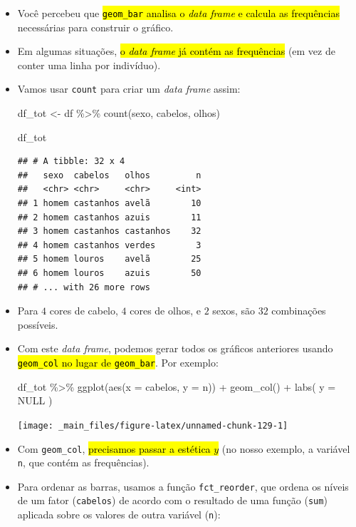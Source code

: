 \documentclass[
  11pt]{report}
\newenvironment{Shaded}{\begin{snugshade}}{\end{snugshade}}
\newcommand{\AttributeTok}[1]{\textcolor[rgb]{0.77,0.63,0.00}{#1}}
\newcommand{\ConstantTok}[1]{\textcolor[rgb]{0.00,0.00,0.00}{#1}}
\newcommand{\FunctionTok}[1]{\textcolor[rgb]{0.00,0.00,0.00}{#1}}
\newcommand{\NormalTok}[1]{#1}
\newcommand{\OtherTok}[1]{\textcolor[rgb]{0.56,0.35,0.01}{#1}}
\newcommand{\SpecialCharTok}[1]{\textcolor[rgb]{0.00,0.00,0.00}{#1}}
\renewenvironment{Shaded}{
    \begin{mdframed}[%
      roundcorner=2pt,%
      innerleftmargin=5pt,%
      innerrightmargin=5pt,%
      topline=true,%
      leftline=true,%
      rightline=true,%
      bottomline=true,%
      linewidth=0.5pt,%
      linecolor=black!20,%
      backgroundcolor=black!2,%
      skipabove=2ex,%
      skipbelow=2.5ex%
    ]%
  }
  {
    \end{mdframed}
  }
\begin{document}
\begin{itemize}
\item
  Você percebeu que {\hl{{\mbox{\texttt{geom\_bar}}} analisa o \emph{data frame} e calcula as frequências}} necessárias para construir o gráfico.
\item
  Em algumas situações, {\hl{o \emph{data frame} já contém as frequências}} (em vez de conter uma linha por indivíduo).
\item
  Vamos usar \texttt{count} para criar um \emph{data frame} assim:

\begin{Shaded}
\begin{Highlighting}[]
\NormalTok{df\_tot }\OtherTok{\textless{}{-}}\NormalTok{ df }\SpecialCharTok{\%\textgreater{}\%} 
  \FunctionTok{count}\NormalTok{(sexo, cabelos, olhos)}

\NormalTok{df\_tot}
\end{Highlighting}
\end{Shaded}

\begin{verbatim}
## # A tibble: 32 x 4
##   sexo  cabelos   olhos         n
##   <chr> <chr>     <chr>     <int>
## 1 homem castanhos avelã        10
## 2 homem castanhos azuis        11
## 3 homem castanhos castanhos    32
## 4 homem castanhos verdes        3
## 5 homem louros    avelã        25
## 6 homem louros    azuis        50
## # ... with 26 more rows
\end{verbatim}
\item
  Para $4$ cores de cabelo, $4$ cores de olhos, e $2$ sexos, são $32$ combinações possíveis.
\item
  Com este \emph{data frame}, podemos gerar todos os gráficos anteriores usando {\hl{{\mbox{\texttt{geom\_col}}} no lugar de {\mbox{\texttt{geom\_bar}}}}}. Por exemplo:

\begin{Shaded}
\begin{Highlighting}[]
\NormalTok{df\_tot }\SpecialCharTok{\%\textgreater{}\%} 
  \FunctionTok{ggplot}\NormalTok{(}\FunctionTok{aes}\NormalTok{(}\AttributeTok{x =}\NormalTok{ cabelos, }\AttributeTok{y =}\NormalTok{ n)) }\SpecialCharTok{+}
    \FunctionTok{geom\_col}\NormalTok{() }\SpecialCharTok{+}
    \FunctionTok{labs}\NormalTok{(}
      \AttributeTok{y =} \ConstantTok{NULL}
\NormalTok{    )}
\end{Highlighting}
\end{Shaded}

  \begin{center}\texttt{[image: \_main\_files/figure-latex/unnamed-chunk-129-1]} \end{center}
\item
  Com \texttt{geom\_col}, {\hl{precisamos passar a estética $y$}} (no nosso exemplo, a variável \texttt{n}, que contém as frequências).
\item
  Para ordenar as barras, usamos a função \texttt{fct\_reorder}, que ordena os níveis de um fator (\texttt{cabelos}) de acordo com o resultado de uma função (\texttt{sum}) aplicada sobre os valores de outra variável (\texttt{n}):


\end{itemize}
\end{document}
